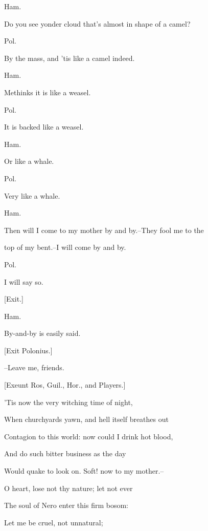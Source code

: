 \documentclass[12pt]{book}
\begin{document}
Ham.

Do you see yonder cloud that's almost in shape of a camel?



Pol.

By the mass, and 'tis like a camel indeed.



Ham.

Methinks it is like a weasel.



Pol.

It is backed like a weasel.



Ham.

Or like a whale.



Pol.

Very like a whale.



Ham.

Then will I come to my mother by and by.--They fool me to the

top of my bent.--I will come by and by.



Pol.

I will say so.



[Exit.]



Ham.

By-and-by is easily said.



[Exit Polonius.]



--Leave me, friends.



[Exeunt Ros, Guil., Hor., and Players.]



'Tis now the very witching time of night,

When churchyards yawn, and hell itself breathes out

Contagion to this world: now could I drink hot blood,

And do such bitter business as the day

Would quake to look on. Soft! now to my mother.--

O heart, lose not thy nature; let not ever

The soul of Nero enter this firm bosom:

Let me be cruel, not unnatural;
\end{document}
